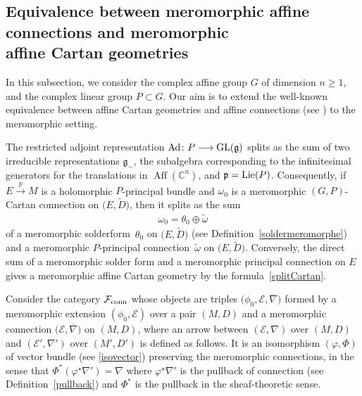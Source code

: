 \documentclass[10pt,a4paper]{amsart}
\numberwithin{equation}{section}
\begin{document}
\subsection[Equivalence between meromorphic affine connections and meromorphic affine Cartan geometries]{Equivalence between meromorphic affine connections and meromorphic \\ affine Cartan geometries}\label{sectionequivalence}

In this subsection, we consider the complex affine group $G$ of dimension $n\geq 1$, and the complex linear group $P\subset G$. Our aim is to extend the well-known equivalence between affine Cartan geometries and affine connections (see \cite[pp.~362--365]{Sharpe}) to the meromorphic setting.

The restricted adjoint representation $\operatorname{Ad}\colon P \longrightarrow {\rm GL}(\mathfrak{g})$ splits as the sum of two irreducible representations $\mathfrak{g}_-$, the subalgebra corresponding to the infinitesimal generators for the translations in $\operatorname{Aff}(\mathbb{C}^n)$, and $\mathfrak{p}={\rm Lie}(P)$. Consequently, if $E\overset{p}{\longrightarrow} M$ is a holomorphic $P$-principal bundle and $\omega_0$ is a meromorphic $(G,P)$-Cartan connection on $\big(E,\tilde{D}\big)$, then it splits as the sum
\begin{gather}\label{splitCartan} \omega_0 = \theta_0 \oplus \tilde{\omega} \end{gather}
 of a meromorphic solderform~$\theta_0$ on $\big(E,\tilde{D}\big)$ (see Definition~\ref{soldermeromorphe}) and a meromorphic $P$-principal connection~$\tilde{\omega}$ on $\big(E,\tilde{D}\big)$. Conversely, the direct sum of a meromorphic solder form and a meromorphic principal connection on $E$ gives a meromorphic affine Cartan geometry by the formula~\eqref{splitCartan}.

Consider the category $\mathcal{F}_{\rm conn}$ whose objects are triples $\big(\phi_0,\mathcal{E},\overline{\nabla}\big)$ formed by a meromorphic extension $(\phi_0,\mathcal{E})$ over a pair $(M,D)$ and a meromorphic connection $\big(\mathcal{E},\overline{\nabla}\big)$ on $(M,D)$, where an arrow between $(\mathcal{E},\nabla)$ over $(M,D)$ and $(\mathcal{E}',\nabla')$ over $(M',D')$ is defined as follows. It is an isomorphism $(\varphi,\Phi)$ of vector bundle (see \eqref{isovector}) preserving the meromorphic connections, in the sense that $\Phi^* (\varphi^\star \nabla')=\nabla$ where $\varphi^\star \nabla'$ is the pullback of connection (see Definition~\ref{pullback}) and $\Phi^*$ is the pullback in the sheaf-theoretic sense.
\end{document}
